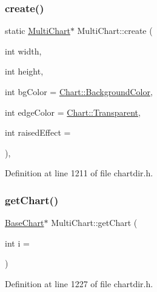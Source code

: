 \subsubsection{\texorpdfstring{create()}{create()}}
{\footnotesize\ttfamily static \hyperlink{class_multi_chart}{Multi\+Chart}$\ast$ Multi\+Chart\+::create (\begin{DoxyParamCaption}\item[{int}]{width,  }\item[{int}]{height,  }\item[{int}]{bg\+Color = {\ttfamily \hyperlink{namespace_chart_abee0d882fdc9ad0b001245ad9fc64011a134193bde693b9d152d0c6dc59fa7d7f}{Chart\+::\+Background\+Color}},  }\item[{int}]{edge\+Color = {\ttfamily \hyperlink{namespace_chart_abee0d882fdc9ad0b001245ad9fc64011afc6811800a9e2582dac0157b6279f836}{Chart\+::\+Transparent}},  }\item[{int}]{raised\+Effect = {} }\end{DoxyParamCaption})\hspace{0.3cm}{\ttfamily [inline]}, {\ttfamily [static]}}



Definition at line 1211 of file chartdir.\+h.

\mbox{\label{class_multi_chart_a17712a61c4b4687e374049b3ea502d98}} 
\subsubsection{\texorpdfstring{get\+Chart()}{getChart()}}
{\footnotesize\ttfamily \hyperlink{class_base_chart}{Base\+Chart}$\ast$ Multi\+Chart\+::get\+Chart (\begin{DoxyParamCaption}\item[{int}]{i = {} }\end{DoxyParamCaption})\hspace{0.3cm}{\ttfamily [inline]}}



Definition at line 1227 of file chartdir.\+h.

\mbox{\label{class_multi_chart_a2e04657227a59f55f04433c0e0df1a2f}} 
